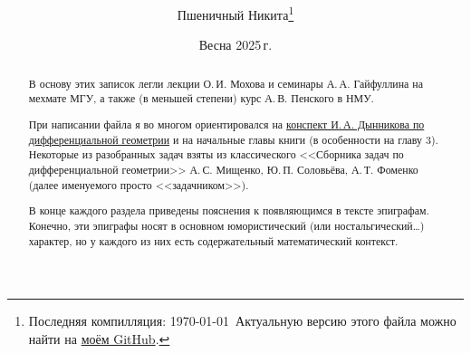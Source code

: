 \documentclass[a4paper, twoside, leqno, 11pt]{article}
\begin{document}
\title{\bfseries\scshape\course}
\date{Весна 2025\,г.}
\author{Пшеничный Никита\thanks{Последняя компилляция: \today\ Актуальную версию этого файла можно найти на \href{https://github.com/pshenikita/Differential-Geometry}{моём GitHub}.}}

\maketitle
\begin{abstract}
	В основу этих записок легли лекции О.\,И. Мохова и семинары А.\,А. Гайфуллина на мехмате МГУ, а также (в меньшей степени) курс А.\,В. Пенского в НМУ.

	При написании файла я во многом ориентировался на \href{https://teach-in.ru/file/methodical/pdf/classical-difgeom-dynnikov-M.pdf}{конспект И.\,А. Дынникова по дифференциальной геометрии} и на начальные главы книги \cite{NT14} (в особенности на главу 3). Некоторые из разобранных задач взяты из классического <<Сборника задач по дифференциальной геометрии>> А.\,С. Мищенко, Ю.\,П. Соловьёва, А.\,Т. Фоменко (далее именуемого просто <<задачником>>).

	В конце каждого раздела приведены пояснения к появляющимся в тексте эпиграфам. Конечно, эти эпиграфы носят в основном юмористический (или ностальгический\ldots) характер, но у каждого из них есть содержательный математический контекст.

	
\end{abstract}

\tableofcontents




\end{document}
